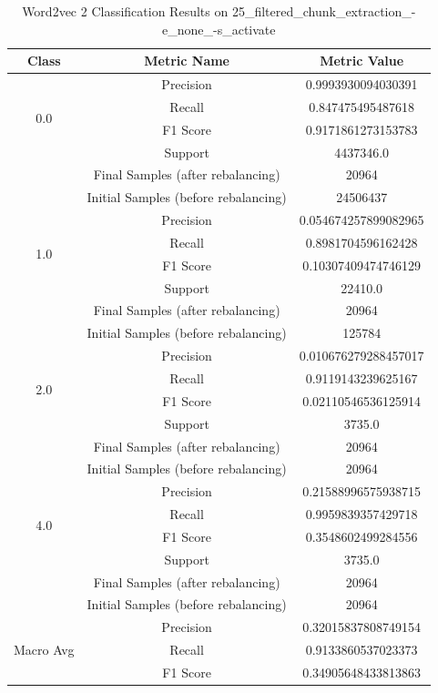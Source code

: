 \begin{longtable}{|c|c|c|}
\caption{Word2vec 2 Classification Results on 25\_filtered\_chunk\_extraction\_-e\_none\_-s\_activate} \label{tab:25_filtered_chunk_extraction_-e_none_-s_activate_word2vec_2_classifiers_results} \\
\hline
Class & Metric Name & Metric Value \\
\hline
\multirow{4}{*}{0.0} & Precision & 0.9993930094030391 \\
 & Recall & 0.847475495487618 \\
 & F1 Score & 0.9171861273153783 \\
 & Support & 4437346.0 \\
 & Final Samples (after rebalancing) & 20964 \\
 & Initial Samples (before rebalancing) & 24506437 \\
\hline
\multirow{4}{*}{1.0} & Precision & 0.054674257899082965 \\
 & Recall & 0.8981704596162428 \\
 & F1 Score & 0.10307409474746129 \\
 & Support & 22410.0 \\
 & Final Samples (after rebalancing) & 20964 \\
 & Initial Samples (before rebalancing) & 125784 \\
\hline
\multirow{4}{*}{2.0} & Precision & 0.010676279288457017 \\
 & Recall & 0.9119143239625167 \\
 & F1 Score & 0.02110546536125914 \\
 & Support & 3735.0 \\
 & Final Samples (after rebalancing) & 20964 \\
 & Initial Samples (before rebalancing) & 20964 \\
\hline
\multirow{4}{*}{4.0} & Precision & 0.21588996575938715 \\
 & Recall & 0.9959839357429718 \\
 & F1 Score & 0.3548602499284556 \\
 & Support & 3735.0 \\
 & Final Samples (after rebalancing) & 20964 \\
 & Initial Samples (before rebalancing) & 20964 \\
\hline
\multirow{4}{*}{Macro Avg} & Precision & 0.32015837808749154 \\
 & Recall & 0.9133860537023373 \\
 & F1 Score & 0.34905648433813863 \\

\end{longtable}
